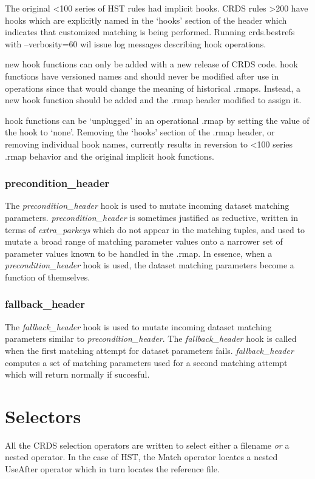 \documentclass[letterpaper,10pt,english]{sphinxmanual}
\begin{document}
The original \textless{}100 series of HST rules had implicit hooks.  CRDS rules \textgreater{}200 have hooks which are explicitly
named in the `hooks' section of the header which indicates that customized matching is being performed.   Running
crds.bestrefs with --verbosity=60 wil issue log messages describing hook operations.

new hook functions can only be added with a new release of CRDS code.   hook functions have versioned names and should
never be modified after use in operations since that would change the meaning of historical .rmaps.  Instead,  a new
hook function should be added and the .rmap header modified to assign it.

hook functions can be `unplugged' in an operational .rmap by setting the value of the hook to `none'.  Removing the
`hooks' section of the .rmap header, or removing individual hook names, currently results in reversion to \textless{}100 series
.rmap behavior and the original implicit hook functions.


\subsubsection{precondition\_header}
\label{rmap_syntax:precondition-header}
The \emph{precondition\_header} hook is used to mutate incoming dataset matching parameters.   \emph{precondition\_header} is
sometimes justified as reductive,  written in terms of \emph{extra\_parkeys} which do not appear in the matching tuples,
and used to mutate a broad range of matching parameter values onto a narrower set of parameter values known to be
handled in the .rmap.   In essence,  when a \emph{precondition\_header} hook is used,  the dataset matching parameters
become a function of themselves.


\subsubsection{fallback\_header}
\label{rmap_syntax:fallback-header}
The \emph{fallback\_header} hook is used to mutate incoming dataset matching parameters similar to \emph{precondition\_header}.
The \emph{fallback\_header} hook is called when the first matching attempt for dataset parameters fails.  \emph{fallback\_header}
computes a set of matching parameters used for a second matching attempt which will return normally if succesful.


\section{Selectors}
\label{rmap_syntax:selectors}
All the CRDS selection operators are written to select either a filename \emph{or} a nested operator.   In the case of HST,
the Match operator locates a nested UseAfter operator which in turn locates the reference file.
\end{document}
